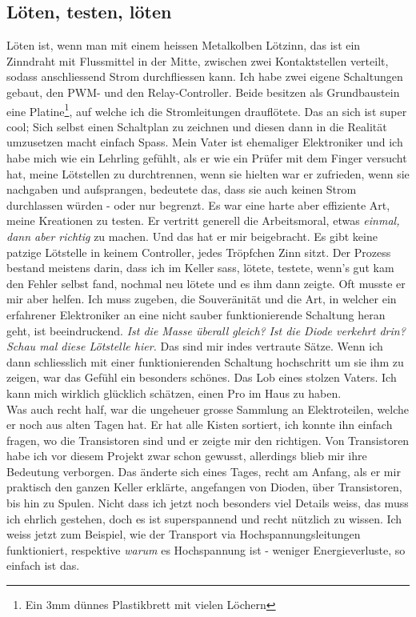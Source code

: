 \documentclass[12pt,titlepage,a4paper]{article}
\begin{document}
\subsection{Löten, testen, löten}
Löten ist, wenn man mit einem heissen Metalkolben Lötzinn, das ist ein Zinndraht mit Flussmittel in der Mitte, zwischen zwei Kontaktstellen verteilt, sodass anschliessend Strom durchfliessen kann. Ich habe zwei eigene Schaltungen gebaut, den PWM- und den Relay-Controller. Beide besitzen als Grundbaustein eine Platine\footnote{Ein 3mm dünnes Plastikbrett mit vielen Löchern}, auf welche ich die Stromleitungen drauflötete. Das an sich ist super cool; Sich selbst einen Schaltplan zu zeichnen und diesen dann in die Realität umzusetzen macht einfach Spass. Mein Vater ist ehemaliger Elektroniker und ich habe mich wie ein Lehrling gefühlt, als er wie ein Prüfer mit dem Finger versucht hat, meine Lötstellen zu durchtrennen, wenn sie hielten war er zufrieden, wenn sie nachgaben und aufsprangen, bedeutete das, dass sie auch keinen Strom durchlassen würden - oder nur begrenzt. Es war eine harte aber effiziente Art, meine Kreationen zu testen. Er vertritt generell die Arbeitsmoral, etwas \textit{einmal, dann aber richtig} zu machen. Und das hat er mir beigebracht. Es gibt keine patzige Lötstelle in keinem Controller, jedes Tröpfchen Zinn sitzt. Der Prozess bestand meistens darin, dass ich im Keller sass, lötete, testete, wenn's gut kam den Fehler selbst fand, nochmal neu lötete und es ihm dann zeigte. Oft musste er mir aber helfen. Ich muss zugeben, die Souveränität und die Art, in welcher ein erfahrener Elektroniker an eine nicht sauber funktionierende Schaltung heran geht, ist beeindruckend. \textit{Ist die Masse überall gleich?} \textit{Ist die Diode verkehrt drin?} \textit{Schau mal diese Lötstelle hier.} Das sind mir indes vertraute Sätze. Wenn ich dann schliesslich mit einer funktionierenden Schaltung hochschritt um sie ihm zu zeigen, war das Gefühl ein besonders schönes. Das Lob eines stolzen Vaters. Ich kann mich wirklich glücklich schätzen, einen Pro im Haus zu haben.\\
Was auch recht half, war die ungeheuer grosse Sammlung an Elektroteilen, welche er noch aus alten Tagen hat. Er hat alle Kisten sortiert, ich konnte ihn einfach fragen, wo die Transistoren sind und er zeigte mir den richtigen. Von Transistoren habe ich vor diesem Projekt zwar schon gewusst, allerdings blieb mir ihre Bedeutung verborgen. Das änderte sich eines Tages, recht am Anfang, als er mir praktisch den ganzen Keller erklärte, angefangen von Dioden, über Transistoren, bis hin zu Spulen. Nicht dass ich jetzt noch besonders viel Details weiss, das muss ich ehrlich gestehen, doch es ist superspannend und recht nützlich zu wissen. Ich weiss jetzt zum Beispiel, wie der Transport via Hochspannungsleitungen funktioniert, respektive \textit{warum} es Hochspannung ist - weniger Energieverluste, so einfach ist das.\\
\end{document}
